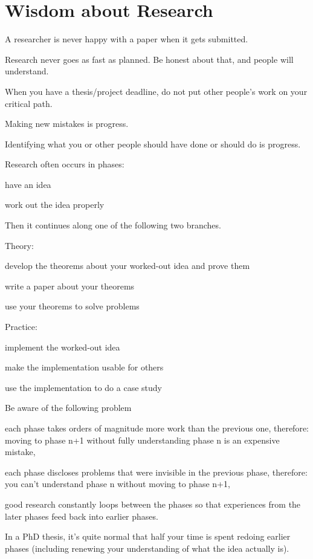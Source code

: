 \documentclass[12pt]{article}
\begin{document}

\section{Wisdom about Research}

A researcher is never happy with a paper when it gets submitted.
\medskip

Research never goes as fast as planned. Be honest about that, and people will understand.
\medskip

When you have a thesis/project deadline, do not put other people's work on your critical path.
\medskip

Making new mistakes is progress.
\medskip

Identifying what you or other people should have done or should do is progress.
\medskip

Research often occurs in phases:
\begin{compactenum}
\item have an idea
\item work out the idea properly
\end{compactenum}

Then it continues along one of the following two branches.

Theory:
\begin{compactenum}
\item develop the theorems about your worked-out idea and prove them
\item write a paper about your theorems
\item use your theorems to solve problems
\end{compactenum}

Practice:
\begin{compactenum}
\item implement the worked-out idea
\item make the implementation usable for others
\item use the implementation to do a case study
\end{compactenum}
\medskip

Be aware of the following problem
\begin{compactitem}
\item each phase takes orders of magnitude more work than the previous one,
  therefore: moving to phase n+1 without fully understanding phase n is an expensive mistake,
\item each phase discloses problems that were invisible in the previous phase,
  therefore: you can't understand phase n without moving to phase n+1,
\item good research constantly loops between the phases so that experiences from the later phases feed back into earlier phases.
\end{compactitem}
In a PhD thesis, it's quite normal that half your time is spent redoing earlier phases (including renewing your understanding of what the idea actually is).
\medskip
\end{document}
